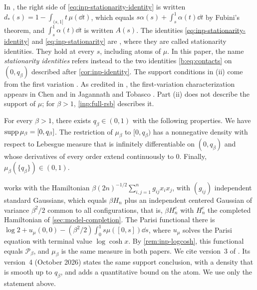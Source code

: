 In \cite{oai-barriers}, the right side of \eqref{eq:inp-stationarity-identity}
is written $d_*(s)=1-\int_{(s,1]}t\,\mu(\dd t)$, which equals
$s\alpha(s)+\int_s^1\alpha(t)\dd t$ by Fubini's theorem, and
$\int_s^1\alpha(t)\dd t$ is written $A(s)$. The identities
\eqref{eq:inp-stationarity-identity} and \eqref{eq:inp-stationarity} are
\cite[(3.14)--(3.15)]{oai-barriers}, where they are called stationarity
identities. They hold at every $s$, including atoms of $\mu$. In this paper,
the name \emph{stationarity identities} refers instead to the two identities
\eqref{b:eq:contacts} on $(0,q_\beta)$ described after \cref{cor:inp-identity}. The support conditions in (ii) come from the first variation
\cite[(3.9)]{oai-barriers}. As credited in \cite[Section~3]{oai-barriers}, the
first-variation characterization appears in Chen
\cite[Theorem~2 and Proposition~1]{chen-2017} and in Jagannath and Tobasco
\cite[Proposition~1.1 and Corollary~3.10]{jagannath-tobasco-2017}. Part (ii) does
not describe the support of $\mu$; for $\beta>1$, \cref{inp:full-rsb}
describes it.

\begin{theorem}\label{inp:full-rsb}
For every $\beta>1$, there exists $q_\beta\in(0,1)$ with the following
properties. We have $\operatorname{supp}\mu_\beta=[0,q_\beta]$. The restriction of $\mu_\beta$
to $[0,q_\beta)$ has a nonnegative density with respect to Lebesgue measure that
is infinitely differentiable on $(0,q_\beta)$ and whose derivatives of every
order extend continuously to $0$. Finally, $\mu_\beta(\{q_\beta\})\in(0,1)$.
\end{theorem}

\cite{full-rsb} works with the Hamiltonian $\beta(2n)^{-1/2}\sum_{i,j=1}^n g_{ij}x_ix_j$,
with $(g_{ij})$ independent standard Gaussians, which equals $\beta H_n$ plus an
independent centered Gaussian of variance $\beta^2/2$ common to all
configurations, that is, $\beta H_n^c$ with $H_n^c$ the completed Hamiltonian of
\cref{sec:model-completion}. The Parisi
functional there is $\log2+u_\mu(0,0)-(\beta^2/2)\int_0^1s\mu([0,s])\dd s$, where
$u_\mu$ solves the Parisi equation with terminal value $\log\cosh x$. By
\cref{rem:inp-logcosh}, this functional equals $\mathcal P_\beta$, and $\mu_\beta$
is the same measure in both papers. We cite version~3 of \cite{full-rsb}. Its
version~4 (October 2026) states the same support conclusion, with a density
that is smooth up to $q_\beta$, and adds a quantitative bound on the atom. We
use only the statement above.

